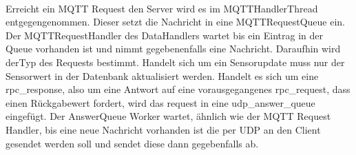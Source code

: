 \documentclass[11pt,a4paper]{report}
\begin{document}
\\
Erreicht ein MQTT Request den Server wird es im MQTTHandlerThread entgegengenommen.
Dieser setzt die Nachricht in eine MQTTRequestQueue ein.
Der MQTTRequestHandler des DataHandlers wartet bis ein Eintrag in der Queue vorhanden ist und nimmt gegebenenfalls eine Nachricht.
Daraufhin wird derTyp des Requests bestimmt.
Handelt sich um ein Sensorupdate muss nur der Sensorwert in der Datenbank aktualisiert werden.
Handelt es sich um eine rpc\_response, also um eine Antwort auf eine vorausgegangenes rpc\_request, dass einen Rückgabewert fordert, wird das request in eine udp\_answer\_queue eingefügt.
Der AnswerQueue Worker wartet, ähnlich wie der MQTT Request Handler, bis eine neue Nachricht vorhanden ist die per UDP an den Client gesendet werden soll und sendet diese dann gegebenfalls ab.
\\
\end{document}
